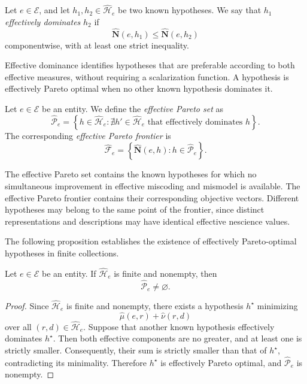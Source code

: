 \begin{definition}
Let $e\in\mathcal E$, and let $h_1,h_2\in\widehat{\mathcal H}_e$ be two known hypotheses. We say that $h_1$ \emph{effectively dominates}  $h_2$ if
\[
\widehat{\mathbf N}(e,h_1) \leq \widehat{\mathbf N}(e,h_2)
\]
componentwise, with at least one strict inequality.
\end{definition}

Effective dominance identifies hypotheses that are preferable
according to both effective measures, without requiring
a scalarization function. A hypothesis is effectively Pareto
optimal when no other known hypothesis dominates it.

\begin{definition}
Let $e\in\mathcal E$ be an entity. We define the \emph{effective Pareto set}  as
\[
\widehat{\mathcal P}_e = \left\{ h\in\widehat{\mathcal H}_e: \nexists h'\in\widehat{\mathcal H}_e 
    \text{ that effectively dominates }h \right\}.
\]
The corresponding \emph{effective Pareto frontier}  is
\[
\widehat{\mathcal F}_e = \left\{ \widehat{\mathbf N}(e,h): h\in\widehat{\mathcal P}_e \right\}.
\]
\end{definition}

The effective Pareto set contains the known hypotheses for which no simultaneous improvement in effective miscoding and mismodel is available. The effective Pareto frontier contains their corresponding objective vectors. Different hypotheses may belong to the same point of the frontier, since distinct representations and descriptions may have identical effective nescience values.

The following proposition establishes the existence of effectively Pareto-optimal hypotheses in finite collections.

\begin{proposition}
\label{prop:effective_pareto_existence}
Let $e\in\mathcal E$ be an entity. If $\widehat{\mathcal H}_e$ is finite and nonempty, then
\[
\widehat{\mathcal P}_e\neq\varnothing.
\]
\end{proposition}
\begin{proof}
Since $\widehat{\mathcal H}_e$ is finite and nonempty, there exists a hypothesis $h^\star$ minimizing
\[
\widehat\mu(e,r)+\widehat\nu(r,d)
\]
over all $(r,d)\in\widehat{\mathcal H}_e$. Suppose that another known hypothesis effectively dominates $h^\star$. Then both effective components are no greater, and at least one is strictly smaller. Consequently, their sum is strictly smaller than that of $h^\star$, contradicting its minimality. Therefore $h^\star$ is effectively Pareto optimal, and $\widehat{\mathcal P}_e$ is nonempty.
\end{proof}

